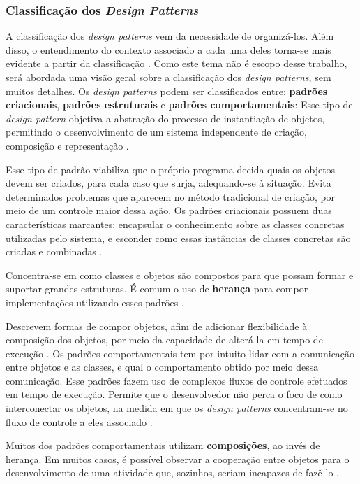 \subsubsection{Classificação dos \textit{Design Patterns}}
A classificação dos \textit{design patterns} vem da necessidade de organizá-los.
Além disso, o entendimento do contexto associado a cada uma deles torna-se mais
evidente a partir da classificação \cite{gammaEtAl1994}. Como este tema não é escopo
desse trabalho, será abordada uma visão geral sobre a classificação dos
\textit{design patterns}, sem muitos detalhes. Os \textit{design patterns}
podem ser classificados entre: \textbf{padrões criacionais},
\textbf{padrões estruturais} e \textbf{padrões comportamentais}:
Esse tipo de \textit{design pattern} objetiva a abstração do processo de
instantiação de objetos, permitindo o desenvolvimento de um sistema independente
de criação, composição e representação \cite{gammaEtAl1994}.
\par
\indent Esse tipo de padrão viabiliza que o próprio programa decida quais os objetos
devem ser criados, para cada caso que surja, adequando-se à situação. Evita determinados
problemas que aparecem no método tradicional de criação, por meio de um controle
maior dessa ação. Os padrões criacionais possuem duas características marcantes:
encapsular o conhecimento sobre as classes concretas utilizadas pelo sistema, e
esconder como essas instâncias de classes concretas são criadas e combinadas
\cite{gammaEtAl1994}.
\par
\indent Concentra-se em como classes e objetos são compostos para que possam
formar e suportar grandes estruturas. É comum o uso de \textbf{herança} para
compor implementações utilizando esses padrões \cite{gammaEtAl1994}.
\par
\indent Descrevem formas de compor objetos, afim de adicionar flexibilidade à
composição dos objetos, por meio da capacidade de alterá-la em tempo de execução
\cite{gammaEtAl1994}.
Os padrões comportamentais tem por intuito lidar com a comunicação entre objetos
e as classes, e qual o comportamento obtido por meio dessa comunicação. Esse
padrões fazem uso de complexos fluxos de controle efetuados em tempo de execução.
Permite que o desenvolvedor não perca o foco de como interconectar os objetos,
na medida em que os \textit{design patterns} concentram-se no fluxo de controle
a eles associado \cite{gammaEtAl1994}.
\par
\indent Muitos dos padrões comportamentais utilizam \textbf{composições}, ao
invés de herança. Em muitos casos, é possível observar a cooperação entre objetos
para o desenvolvimento de uma atividade que, sozinhos, seriam incapazes de
fazê-lo \cite{gammaEtAl1994}.

